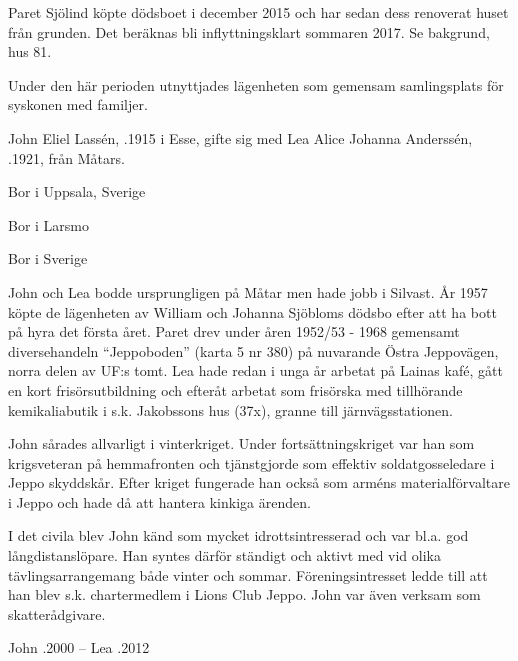 
Paret Sjölind köpte dödsboet i december 2015 och har sedan dess renoverat huset från grunden. Det beräknas bli inflyttningsklart sommaren	2017. Se bakgrund, hus 81.



Under den här perioden utnyttjades lägenheten som gemensam samlingsplats för syskonen med familjer.

\jhhousepic{}{}



John Eliel Lassén, .1915 i Esse, gifte sig med Lea Alice Johanna Anderssén, .1921, från Måtars.
\begin{jhchildren}
  \item {} Bor i Uppsala, Sverige
  \item {} Bor i Larsmo
  \item {}
  \item {} Bor i Sverige
  \item {}
\end{jhchildren}


John och Lea bodde ursprungligen på Måtar men hade jobb i Silvast. År 1957 köpte de lägenheten av William och Johanna Sjöbloms dödsbo efter att ha bott på hyra det första året. Paret drev under åren 1952/53 - 1968 gemensamt diversehandeln ``Jeppoboden'' (karta 5 nr 380) på nuvarande Östra Jeppovägen, norra delen av UF:s tomt. Lea hade redan i unga år arbetat på Lainas kafé, gått en kort frisörsutbildning och efteråt arbetat som frisörska med tillhörande kemikaliabutik i s.k. Jakobssons hus (37x), granne till järnvägsstationen.

John sårades allvarligt i vinterkriget. Under fortsättningskriget var han som krigsveteran på hemmafronten och tjänstgjorde som effektiv 	soldatgosseledare i Jeppo skyddskår. Efter kriget fungerade han också som arméns materialförvaltare i Jeppo och hade då att hantera kinkiga ärenden.


I det civila blev John känd som mycket idrottsintresserad och var bl.a. god långdistanslöpare. Han syntes därför ständigt och aktivt med vid olika tävlingsarrangemang både vinter och sommar. Föreningsintresset ledde till att han blev s.k. chartermedlem i Lions Club Jeppo. John var även verksam som skatterådgivare.

John .2000  --  Lea .2012



